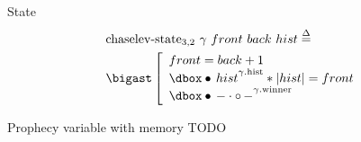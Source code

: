 
\begin{frame}{State}
\begin{align*}
		&\mathrm{chaselev \mathhyphen state_{3,2}}\ \gamma\ front\ back\ hist
		\eqdef
	\\
		&\iBigsep\left[\begin{array}{l}
				front = back + 1
			\\
				\iGhost{\gamma\mathrm{.hist}}{\iAuth{hist}} \iSep
				| hist | = front
			\\
				\iGhost{\gamma\mathrm{.winner}}{\iAuth{-} \cdot \iFrag{-}}
		\end{array}\right.
\end{align*}
\end{frame}


\begin{frame}{Prophecy variable with memory}
TODO
\end{frame}